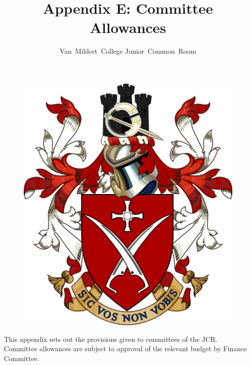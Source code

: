 \documentclass[12pt]{article}
\title{Appendix E: Committee Allowances}
\author{Van~Mildert~College Junior~Common~Room}
\date{\thedate}
\begin{document}
\begin{titlepage}  %
    \maketitle
    \begin{figure}[h]
        \includegraphics[scale=0.25]{arms}  %
        \centering
    \end{figure}
    \thispagestyle{empty}
\end{titlepage}
\setcounter{page}{2}  %
This appendix sets out the provisions given to committees of the JCR. Committee allowances are subject to approval of the relevant budget by Finance Committee.
\end{document}
